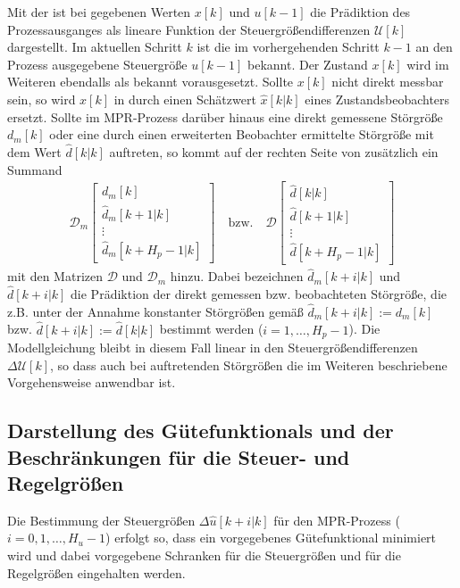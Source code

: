 Mit der  ist bei gegebenen Werten $x[k]$ und $u[k-1]$ die Prädiktion des Prozessausganges als lineare Funktion der
Steuergrößendifferenzen $\mathcal{U}[k]$ dargestellt. Im aktuellen Schritt $k$ ist die im vorhergehenden Schritt $k-1$ an den Prozess ausgegebene Steuergröße $u[k-1]$ bekannt. Der
Zustand $x[k]$ wird im Weiteren ebendalls als bekannt vorausgesetzt. Sollte $x[k]$ nicht direkt messbar sein, so wird $x[k]$ in  durch
einen Schätzwert $\hat{x}[k|k]$ eines Zustandsbeobachters ersetzt. Sollte im \ac{MPR}-Prozess  darüber hinaus eine direkt gemessene Störgröße
$d_m[k]$ oder eine durch einen erweiterten Beobachter ermittelte Störgröße mit dem Wert $\hat{d}[k|k]$ auftreten, so kommt auf der rechten Seite von
 zusätzlich ein Summand
\begin{align*}
	\mathcal{D}_m\begin{bmatrix}
	d_m[k]\\ \hat{d}_m[k+1|k]\\ \vdots \\ \hat{d}_m[k+H_p-1|k]
	\end{bmatrix}\quad\text{bzw.}\quad \mathcal{D}\begin{bmatrix}
	\hat{d}[k|k]\\ \hat{d}[k+1|k]\\ \vdots\\ \hat{d}[k+H_p-1|k]
	\end{bmatrix}
\end{align*}
mit den Matrizen $\mathcal{D}$ und $\mathcal{D}_m$ hinzu. Dabei bezeichnen $\hat{d}_m[k+i|k]$ und $\hat{d}[k+i|k]$ die Prädiktion der direkt gemessen bzw. beobachteten Störgröße, die
z.B. unter der Annahme konstanter Störgrößen gemäß $\hat{d}_m[k+i|k]:=d_m[k]$ bzw. $\hat{d}[k+i|k]:=\hat{d}[k|k]$ bestimmt werden ($i=1,\ldots,H_p-1$). Die Modellgleichung
 bleibt in diesem Fall linear in den Steuergrößendifferenzen $\Delta\mathcal{U}[k]$, so dass auch bei auftretenden Störgrößen die im
Weiteren beschriebene Vorgehensweise anwendbar ist.

\subsection{Darstellung des Gütefunktionals und der Beschränkungen für die Steuer- und Regelgrößen}
Die Bestimmung der Steuergrößen $\Delta\hat{u}[k+i|k]$ für den \ac{MPR}-Prozess ($i=0,1,\ldots,H_u-1$) erfolgt so, dass ein vorgegebenes Gütefunktional minimiert wird und dabei
vorgegebene Schranken für die Steuergrößen und für die Regelgrößen eingehalten werden.

